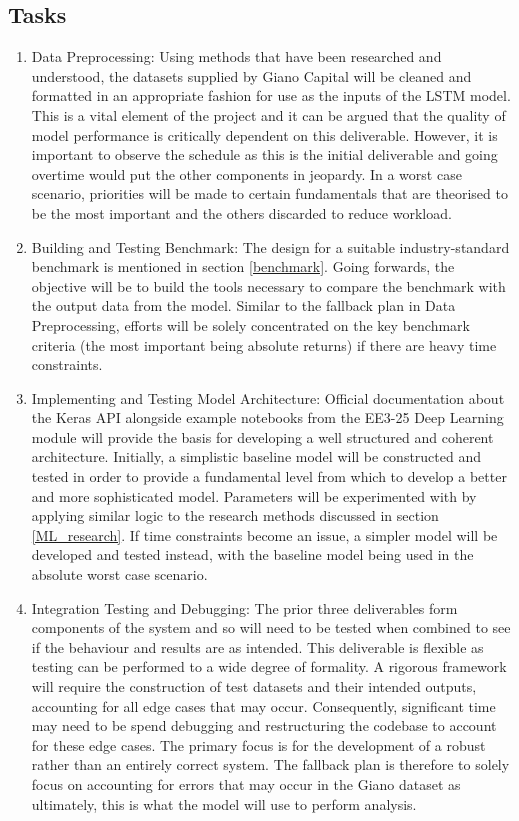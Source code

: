 \documentclass[10pt,onecolumn,letterpaper]{article}
\begin{document}
\subsection{Tasks} \label{tasks}
\begin{enumerate}
	\item Data Preprocessing: Using methods that have been researched and understood, the datasets supplied by Giano Capital will be cleaned and formatted in an appropriate fashion for use as the inputs of the LSTM model. This is a vital element of the project and it can be argued that the quality of model performance is critically dependent on this deliverable. However, it is important to observe the schedule as this is the initial deliverable and going overtime would put the other components in jeopardy. In a worst case scenario, priorities will be made to certain fundamentals that are theorised to be the most important and the others discarded to reduce workload.
	 \item Building and Testing Benchmark: The design for a suitable industry-standard benchmark is mentioned in section \ref{benchmark}. Going forwards, the objective will be to build the tools necessary to compare the benchmark with the output data from the model. Similar to the fallback plan in Data Preprocessing, efforts will be solely concentrated on the key benchmark criteria (the most important being absolute returns) if there are heavy time constraints. 
	\item Implementing and Testing Model Architecture: Official documentation about the Keras API alongside example notebooks from the EE3-25 Deep Learning module will provide the basis for developing a well structured and coherent architecture. Initially, a simplistic baseline model will be constructed and tested in order to provide a fundamental level from which to develop a better and more sophisticated model. Parameters will be experimented with by applying similar logic to the research methods discussed in section \ref{ML_research}. If time constraints become an issue, a simpler model will be developed and tested instead, with the baseline model being used in the absolute worst case scenario. 
	\item Integration Testing and Debugging: The prior three deliverables form components of the system and so will need to be tested when combined to see if the behaviour and results are as intended. This deliverable is flexible as testing can be performed to a wide degree of formality. A rigorous framework will require the construction of test datasets and their intended outputs, accounting for all edge cases that may occur. Consequently, significant time may need to be spend debugging and restructuring the codebase to account for these edge cases. The primary focus is for the development of a robust rather than an entirely correct system. The fallback plan is therefore to solely focus on accounting for errors that may occur in the Giano dataset as ultimately, this is what the model will use to perform analysis. 

\end{enumerate}
\end{document}
